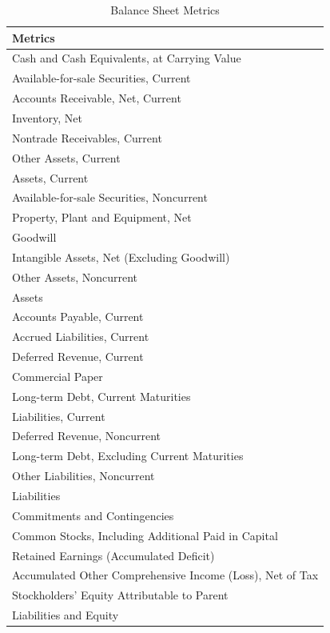 \documentclass[]{book}
\theoremstyle{definition}
\theoremstyle{definition}
\theoremstyle{definition}
\theoremstyle{remark}
\begin{document}
\begin{table}[t]

\caption{\label{tab:unnamed-chunk-33}Balance Sheet Metrics}
\centering
\begin{tabular}{l}
\toprule
Metrics\\
\midrule
Cash and Cash Equivalents, at Carrying Value\\
Available-for-sale Securities, Current\\
Accounts Receivable, Net, Current\\
Inventory, Net\\
Nontrade Receivables, Current\\
\addlinespace
Other Assets, Current\\
Assets, Current\\
Available-for-sale Securities, Noncurrent\\
Property, Plant and Equipment, Net\\
Goodwill\\
\addlinespace
Intangible Assets, Net (Excluding Goodwill)\\
Other Assets, Noncurrent\\
Assets\\
Accounts Payable, Current\\
Accrued Liabilities, Current\\
\addlinespace
Deferred Revenue, Current\\
Commercial Paper\\
Long-term Debt, Current Maturities\\
Liabilities, Current\\
Deferred Revenue, Noncurrent\\
\addlinespace
Long-term Debt, Excluding Current Maturities\\
Other Liabilities, Noncurrent\\
Liabilities\\
Commitments and Contingencies\\
Common Stocks, Including Additional Paid in Capital\\
\addlinespace
Retained Earnings (Accumulated Deficit)\\
Accumulated Other Comprehensive Income (Loss), Net of Tax\\
Stockholders' Equity Attributable to Parent\\
Liabilities and Equity\\
\bottomrule
\end{tabular}
\end{table}
\end{document}
